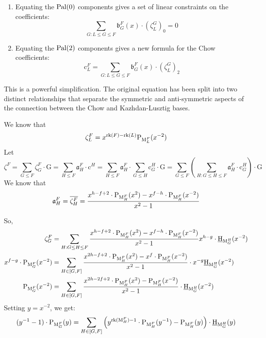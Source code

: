 \documentclass[11pt]{article}
\newcommand{\chow}{\normalfont\text{\underline{H}}}
\newcommand{\klpoly}{\normalfont\text{P}}
\newcommand{\rank}{\normalfont\text{rk}}
\newcommand{\M}{\normalfont\text{M}}
\newcommand{\Ebasis}[1]{\mathrm{#1}}
\newcommand{\Cbasis}[1]{\mathrm{c}^{#1}}
\newcommand{\CbasisSub}[2]{\mathrm{c}^{#1}_{#2}}
\newcommand{\Zbasis}[1]{\zeta^{#1}}
\newcommand{\ZbasisSub}[2]{\zeta^{#1}_{#2}}
\newcommand{\Ibasis}[2]{\mathfrak{b}^{#1}_{#2}}
\newcommand{\pal}{\normalfont\text{Pal}}
\newcommand{\klchowcoeff}{\mathfrak{a}}
\newcommand{\palcomp}[2]{\left(#1\right)_{#2}}
\theoremstyle{remark}
\begin{document}
\begin{tcolorbox}[colback=blue!5!white,colframe=blue!75!black,title=Simplified Identities (for $L<F$)]
\begin{enumerate}
    \item Equating the $\pal(0)$ components gives a set of linear constraints on the coefficients:
        \[ \sum_{G: L \le G \le F} \Ibasis{F}{G}(x) \cdot \palcomp{\ZbasisSub{G}{L}}{0} = 0 \]

    \item Equating the $\pal(2)$ components gives a new formula for the Chow coefficients:
        \[ \CbasisSub{F}{L} = \sum_{G: L \le G \le F} \Ibasis{F}{G}(x) \cdot \palcomp{\ZbasisSub{G}{L}}{2} \]
\end{enumerate}
\end{tcolorbox}

This is a powerful simplification. The original equation has been split into two distinct relationships that separate the symmetric and anti-symmetric aspects of the connection between the Chow and Kazhdan-Lusztig bases.

We know that
\[ \ZbasisSub{F}{L} = x^{\rank(F)-\rank(L)} \klpoly_{\M_L^F}(x^{-2}) \]
Let 
\[ \Zbasis{F} = \sum_{G \le F} \ZbasisSub{F}{G} \cdot \Ebasis{G}
= \sum_{H \le F} \klchowcoeff_{H}^F \cdot \Cbasis{H}
= \sum_{H \le F} \klchowcoeff_{H}^F \cdot \sum_{G \le H}
\CbasisSub{H}{G} \cdot \Ebasis{G}
= \sum_{G\le F}\left(\sum_{H:G\le H\le F} \klchowcoeff_{H}^F \cdot
\CbasisSub{H}{G}\right) \cdot \Ebasis{G}\]
We know that
\[\klchowcoeff_{H}^F = \overline{\ZbasisSub{F}{H}}
=\frac{x^{h-f+2}\cdot\klpoly_{\M_H^F}(x^2)-x^{f-h}\cdot\klpoly_{\M_H^F}(x^{-2})}
{x^2-1}\]

So,
\begin{align*}
\ZbasisSub{F}{G} &= \sum_{H:G\le H\le F} \frac{x^{h-f+2}\cdot
\klpoly_{\M_H^F}(x^2)-x^{f-h}\cdot\klpoly_{\M_H^F}(x^{-2})}
{x^2-1} x^{h-g} \cdot \chow_{\M_G^H}(x^{-2})\\
x^{f-g}\cdot\klpoly_{\M_G^F}(x^{-2})
&= \sum_{H\in [G,F]} \frac{x^{2h-f+2}\cdot\klpoly_{\M_H^F}(x^2)-x^f\cdot\klpoly_{\M_H^F}
(x^{-2})}
{x^2-1} \cdot x^{-g}\chow_{\M_G^H}(x^{-2})\\
\klpoly_{\M_G^F}(x^{-2})
&= \sum_{H\in [G,F]} \frac{x^{2h-2f+2}\cdot\klpoly_{\M_H^F}(x^2)
-\klpoly_{\M_H^F}
(x^{-2})}{x^2-1}\cdot \chow_{\M_G^H}(x^{-2})\\
\end{align*}
Setting \(y=x^{-2}\), we get:
\[(y^{-1}-1)\cdot\klpoly_{\M_G^F}(y) =
\sum_{H\in [G,F]} \left(y^{\rank(\M_H^F)-1}\cdot\klpoly_{\M_H^F}(y^{-1})
-\klpoly_{\M_H^F}(y)\right)\cdot \chow_{\M_G^H}(y)\]
\end{document}
